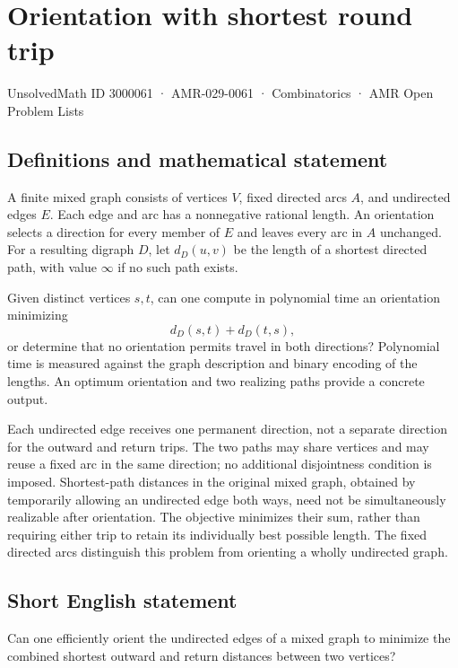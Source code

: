 \documentclass[11pt,a4paper]{article}
\begin{document}
\section*{Orientation with shortest round trip}\label{3000061}
{\small UnsolvedMath ID 3000061 · AMR-029-0061 · Combinatorics · AMR Open Problem Lists}
\subsection{Definitions and mathematical statement}
A finite mixed graph consists of vertices $V$, fixed directed arcs
$A$, and undirected edges $E$. Each edge and arc has a nonnegative
rational length. An orientation selects a direction for every member
of $E$ and leaves every arc in $A$ unchanged. For a resulting digraph
$D$, let $d_D(u,v)$ be the length of a shortest directed path, with
value $\infty$ if no such path exists.

Given distinct vertices $s,t$, can one compute in polynomial time
an orientation minimizing
\[
                                d_D(s,t)+d_D(t,s),
\]
or determine that no orientation permits travel in both directions?
Polynomial time is measured against the graph description and binary
encoding of the lengths. An optimum orientation and two realizing
paths provide a concrete output.

Each undirected edge receives one permanent direction, not a separate
direction for the outward and return trips. The two paths may share
vertices and may reuse a fixed arc in the same direction; no additional
disjointness condition is imposed. Shortest-path distances in the
original mixed graph, obtained by temporarily allowing an undirected
edge both ways, need not be simultaneously realizable after orientation.
The objective minimizes their sum, rather than requiring either trip
to retain its individually best possible length. The fixed directed
arcs distinguish this problem from orienting a wholly undirected graph.
\subsection{Short English statement}
Can one efficiently orient the undirected edges of a mixed graph
to minimize the combined shortest outward and return distances between two vertices?
\end{document}
